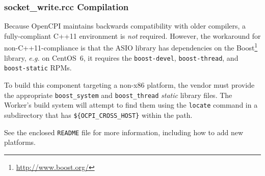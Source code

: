 \documentclass{article}
\def\comp{socket\_write}
\begin{document}
\subsubsection*{\comp.rcc Compilation}
Because OpenCPI maintains backwards compatibility with older compilers, a fully-compliant C++11 environment is \textit{not} required. However, the workaround for non-C++11-compliance is that the ASIO library has dependencies on the Boost\footnote{\url{http://www.boost.org/}} library, \textit{e.g.} on CentOS~6, it requires the \verb+boost-devel+, \verb|boost-thread|, and \verb|boost-static| RPMs.\medskip

To build this component targeting a non-x86 platform, the vendor must provide the appropriate \verb+boost_system+ and \verb+boost_thread+ \textit{static} library files. The Worker's build system will attempt to find them using the \verb+locate+ command in a subdirectory that has \verb+${OCPI_CROSS_HOST}+ within the path.\medskip

See the enclosed \verb+README+ file for more information, including how to add new platforms.
\end{document}
